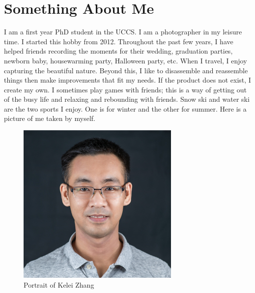 \section{Something About Me}
I am a first year PhD student in the UCCS. I am a photographer in my leisure time. I started this hobby from 2012. Throughout the past few years, I have helped friends recording the moments for their wedding, graduation parties, newborn baby, housewarming party, Halloween party, etc. When I travel, I enjoy capturing the beautiful nature. Beyond this, I like to disassemble and reassemble things then make improvements that fit my needs. If the product does not exist, I create my own. I sometimes play games with friends; this is a way of getting out of the busy life and relaxing and rebounding with friends. Snow ski and water ski are the two sports I enjoy. One is for winter and the other for summer. Here is a picture of me taken by myself.

\begin{figure}[htbp]
\centerline{\includegraphics{zhang.jpg}}
\caption{Portrait of Kelei Zhang}
\label{fig}
\end{figure}